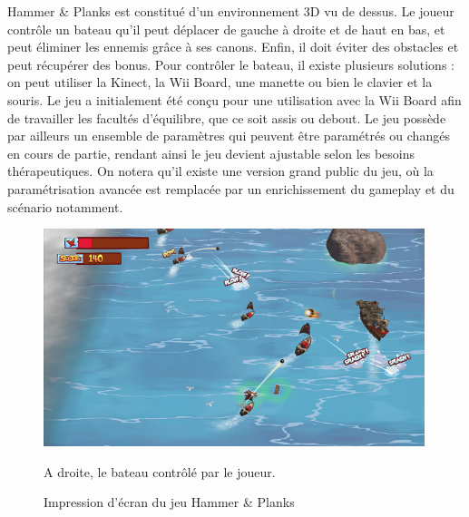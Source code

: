 Hammer \& Planks est constitué d’un environnement 3D vu de dessus. Le joueur contrôle un bateau qu'il peut déplacer de gauche à droite et de haut en bas, et peut éliminer les ennemis grâce à ses canons. Enfin, il doit éviter des obstacles et peut récupérer des bonus. Pour contrôler le bateau, il existe plusieurs solutions : on peut utiliser la Kinect, la Wii Board, une manette ou bien le clavier et la souris. Le jeu a initialement été conçu pour une utilisation avec la Wii Board afin de travailler les facultés d'équilibre, que ce soit assis ou debout. Le jeu possède par ailleurs un ensemble de paramètres qui peuvent être paramétrés ou changés en cours de partie, rendant ainsi le jeu devient ajustable selon les besoins thérapeutiques. On notera qu'il existe une version grand public du jeu, où la paramétrisation avancée est remplacée par un enrichissement du gameplay et du scénario notamment.
	\begin{figure}[!h]
		\centering
		\includegraphics[width=420px]{images/hammer_and_planks.png}
		\caption{Impression d'écran du jeu Hammer \& Planks}
		A droite, le bateau contrôlé par le joueur.
		\label{hammer_and_planks}
	\end{figure}
